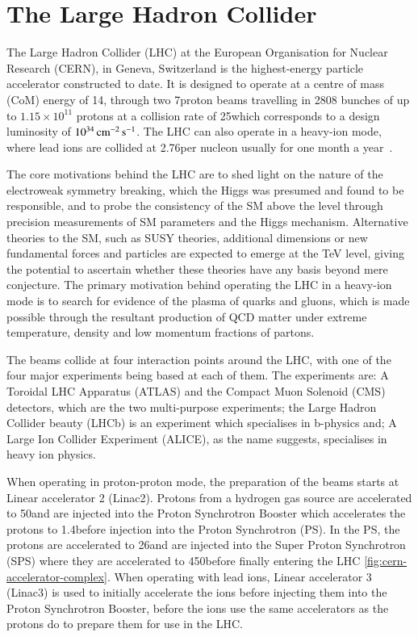 \section{The Large Hadron Collider}\label{sec:lhc}

The Large Hadron Collider (LHC) at the European Organisation for Nuclear Research (CERN), in Geneva, Switzerland is the highest-energy particle accelerator constructed to date. 
It is designed to operate at a centre of mass (CoM) energy of 14\TeV, through two 7\TeV proton beams travelling in 2808 bunches of up to $1.15 \times 10^{11}$ protons at a collision rate of 25\nsm which corresponds to a design luminosity of $10^{34}\,\text{cm}^\text{$-$2}\,\text{s}^\text{$-$1}$. 
The LHC can also operate in a heavy-ion mode, where lead ions are collided at 2.76\TeV per nucleon usually for one month a year~\cite{Bayatian:2006zz}.

The core motivations behind the LHC are to shed light on the nature of the electroweak symmetry breaking, which the Higgs was presumed and found to be responsible, and to probe the consistency of the SM above the \TeV level through precision measurements of SM parameters and the Higgs mechanism.
Alternative theories to the SM, such as SUSY theories, additional dimensions or new fundamental forces and particles are expected to emerge at the TeV level, giving the potential to ascertain whether these theories have any basis beyond mere conjecture.
The primary motivation behind operating the LHC in a heavy-ion mode is to search for evidence of the plasma of quarks and gluons, which is made possible through the resultant production of QCD matter under extreme temperature, density and low momentum fractions of partons.~\cite{Baur:687318}

The beams collide at four interaction points around the LHC, with one of the four major experiments being based at each of them. 
The experiments are: A Toroidal LHC Apparatus (ATLAS) and the Compact Muon Solenoid (CMS) detectors, which are the two multi-purpose experiments; the Large Hadron Collider beauty (LHCb) is an experiment which specialises in b-physics and; A Large Ion Collider Experiment (ALICE), as the name suggests, specialises in heavy ion physics\cite{Brüning:782076}. 

When operating in proton-proton mode, the preparation of the beams starts at Linear accelerator 2 (Linac2). 
Protons from a hydrogen gas source are accelerated to 50\MeV and are injected into the Proton Synchrotron Booster which accelerates the protons to 1.4\GeV before injection into the Proton Synchrotron (PS). 
In the PS, the protons are accelerated to 26\GeV and are injected into the Super Proton Synchrotron (SPS) where they are accelerated to 450\GeV before finally entering the LHC \ref{fig:cern-accelerator-complex}. 
When operating with lead ions, Linear accelerator 3 (Linac3) is used to initially accelerate the ions before injecting them into the Proton Synchrotron Booster, before the ions use the same accelerators as the protons do to prepare them for use in the LHC\cite{Brüning:782076}. 

